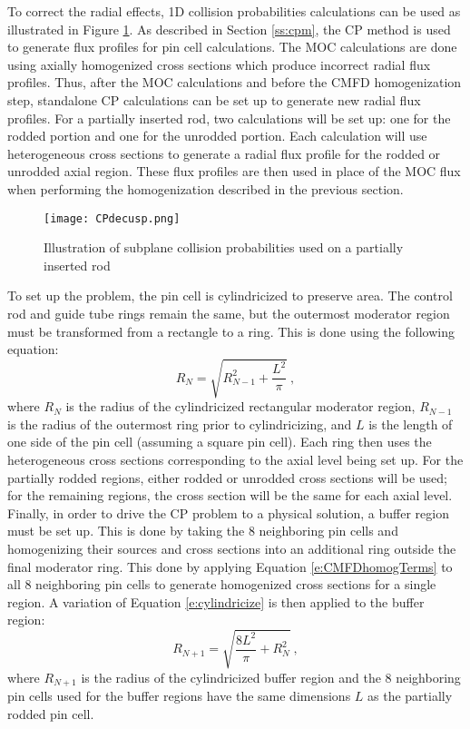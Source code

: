 To correct the radial effects, 1D collision probabilities calculations can be used as illustrated in Figure \ref{f:SCPdecusping}.  As described in Section \ref{ss:cpm}, the CP method is used to generate flux profiles for pin cell calculations.  The MOC calculations are done using axially homogenized cross sections which produce incorrect radial flux profiles.  Thus, after the MOC calculations and before the CMFD homogenization step, standalone CP calculations can be set up to generate new radial flux profiles.  For a partially inserted rod, two calculations will be set up: one for the rodded portion and one for the unrodded portion.  Each calculation will use heterogeneous cross sections to generate a radial flux profile for the rodded or unrodded axial region.  These flux profiles are then used in place of the MOC flux when performing the homogenization described in the previous section.

\begin{figure}
    \centering
    \texttt{[image: CPdecusp.png]}
    \caption[Subplane Collision Probabilities Illustration]{Illustration of subplane collision probabilities used on a partially inserted rod}\label{f:SCPdecusping}
\end{figure}

To set up the problem, the pin cell is cylindricized to preserve area.  The control rod and guide tube rings remain the same, but the outermost moderator region must be transformed from a rectangle to a ring.  This is done using the following equation:
\begin{equation}\label{e:cylindricize}
R_N = \sqrt{R_{N-1}^2 + \frac{L^2}{\pi}}\ ,
\end{equation}
where $R_N$ is the radius of the cylindricized rectangular moderator region, $R_{N-1}$ is the radius of the outermost ring prior to cylindricizing, and $L$ is the length of one side of the pin cell (assuming a square pin cell).  Each ring then uses the heterogeneous cross sections corresponding to the axial level being set up.  For the partially rodded regions, either rodded or unrodded cross sections will be used; for the remaining regions, the cross section will be the same for each axial level.  Finally, in order to drive the CP problem to a physical solution, a buffer region must be set up.  This is done by taking the 8 neighboring pin cells and homogenizing their sources and cross sections into an additional ring outside the final moderator ring.  This done by applying Equation \ref{e:CMFDhomogTerms} to all 8 neighboring pin cells to generate homogenized cross sections for a single region.  A variation of Equation \ref{e:cylindricize} is then applied to the buffer region:
\begin{equation}\label{e:cylindricizeBuffer}
R_{N+1} = \sqrt{\frac{8 L^2}{\pi} + R_N^2}\ ,
\end{equation}
where $R_{N+1}$ is the radius of the cylindricized buffer region and the 8 neighboring pin cells used for the buffer regions have the same dimensions $L$ as the partially rodded pin cell.

